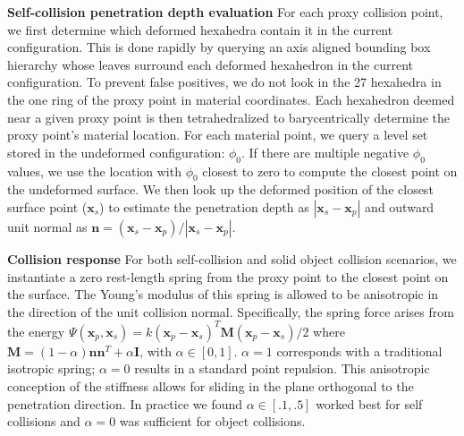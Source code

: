 \textbf{Self-collision penetration depth evaluation }
For each proxy collision point, we first determine which deformed hexahedra contain it in the current configuration. This is done rapidly by querying an axis aligned bounding box hierarchy whose leaves surround each deformed hexahedron in the current configuration. To prevent false positives, we do not look in the 27 hexahedra in the one ring of the proxy point in material coordinates. Each hexahedron deemed near a given proxy point is then tetrahedralized to barycentrically determine the proxy point's material location. For each material point, we query a level set stored in the undeformed configuration: $\phi_0$.  If there are multiple negative $\phi_0$ values, we use the location with $\phi_0$ closest to zero to compute the closest point on the undeformed surface. We then look up the deformed position of the closest surface point ($\mathbf{x}_s$)  to estimate the penetration depth as $\left|\mathbf{x}_s-\mathbf{x}_p\right|$ and outward unit normal as $\mathbf{n}=\left(\mathbf{x}_s-\mathbf{x}_p\right)/\left|\mathbf{x}_s-\mathbf{x}_p\right|$.

\textbf{Collision response }
For both self-collision and solid object collision scenarios, we instantiate a zero rest-length spring from the proxy point to the closest point on the surface. The Young's modulus of this spring is allowed to be anisotropic in the direction of the unit collision normal. Specifically, the spring force arises from the energy
$\Psi(\mathbf{x}_p,\mathbf{x}_s)=k(\mathbf{x}_p-\mathbf{x}_s)^T\mathbf{M}(\mathbf{x}_p-\mathbf{x}_s)/2$
where  $\mathbf{M}=\left(1-\alpha\right)\mathbf{n}\mathbf{n}^T+\alpha\mathbf{I}$, with $\alpha\in[0,1]$.  $\alpha=1$ corresponds with a traditional isotropic spring; $\alpha=0$ results in a standard point repulsion.  This anisotropic conception of the stiffness allows for sliding in the plane orthogonal to the penetration direction. In practice we found $\alpha\in[.1,.5]$ worked best for self collisions and $\alpha = 0$ was sufficient for object collisions.

